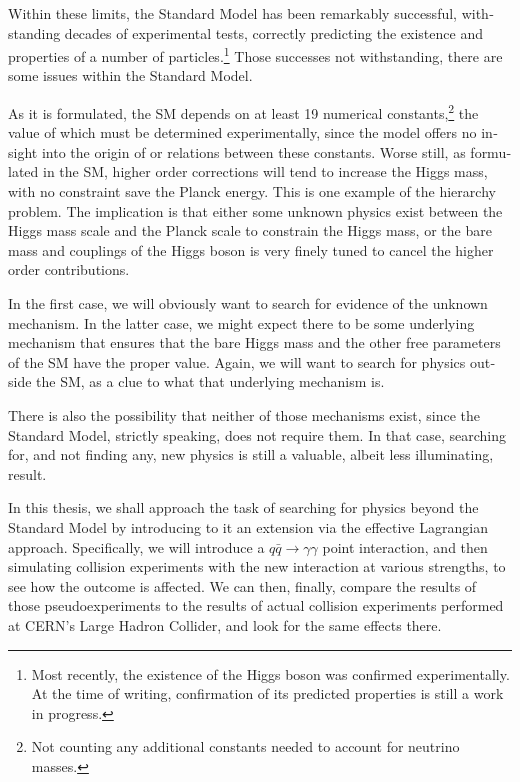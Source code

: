 \begin{english}
Within these limits, the Standard Model has been remarkably successful, withstanding decades of experimental tests, correctly predicting the existence and properties of a number of particles.\footnote{Most recently, the existence of the Higgs boson was confirmed experimentally. At the time of writing, confirmation of its predicted properties is still a work in progress.} Those successes not withstanding, there are some issues within the Standard Model.

As it is formulated, the SM depends on at least 19 numerical constants,\footnote{Not counting any additional constants needed to account for neutrino masses.} the value of which must be determined experimentally, since the model offers no insight into the origin of or relations between these constants. Worse still, as formulated in the SM, higher order corrections will tend to increase the Higgs mass, with no constraint save the Planck energy. This is one example of the hierarchy problem. The implication is that either some unknown physics exist between the Higgs mass scale and the Planck scale to constrain the Higgs mass, or the bare mass and couplings of the Higgs boson is very finely tuned to cancel the higher order contributions.

In the first case, we will obviously want to search for evidence of the unknown mechanism. In the latter case, we might expect there to be some underlying mechanism that ensures that the bare Higgs mass and the other free parameters of the SM have the proper value. Again, we will want to search for physics outside the SM, as a clue to what that underlying mechanism is.

There is also the possibility that neither of those mechanisms exist, since the Standard Model, strictly speaking, does not require them. In that case, searching for, and not finding any, new physics is still a valuable, albeit less illuminating, result.

In this thesis, we shall approach the task of searching for physics beyond the Standard Model by introducing to it an extension via the effective Lagrangian approach. Specifically, we will introduce a $q\bar q\rightarrow\gamma\gamma$ point interaction, and then simulating collision experiments with the new interaction at various strengths, to see how the outcome is affected. We can then, finally, compare the results of those pseudoexperiments to the results of actual collision experiments performed at CERN's Large Hadron Collider, and look for the same effects there.


\end{english}
